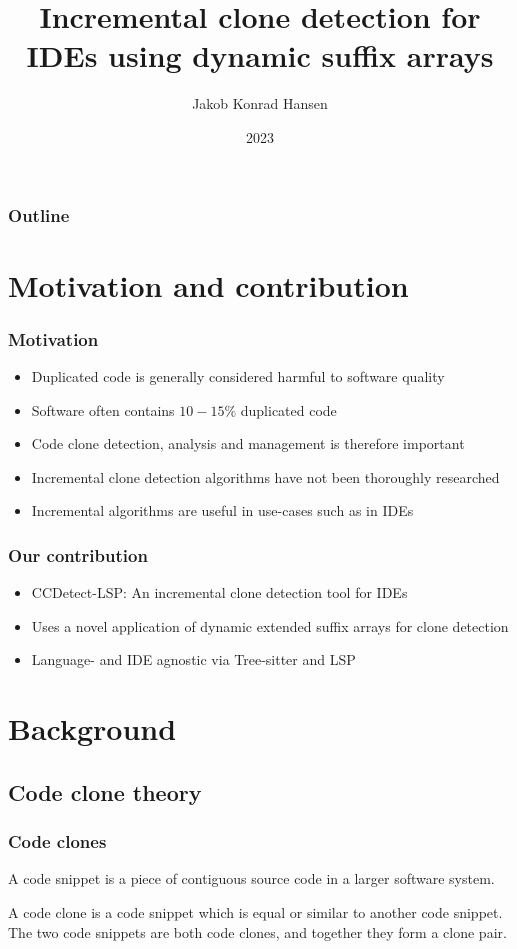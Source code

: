 \documentclass[aspectratio=1610, xcolor=table]{beamer}
\title{Incremental clone detection for IDEs using dynamic suffix arrays}
\author{Jakob Konrad Hansen}
\institute{University of Oslo}
\date{2023}
\begin{document}
\frame{\titlepage}

\begin{frame}
    \frametitle{Outline}
    \tableofcontents
\end{frame}

\section{Motivation and contribution}

\begin{frame}
\frametitle{Motivation}
\begin{itemize}
    \item Duplicated code is generally considered harmful to software quality
    \item Software often contains $10-15\%$ duplicated code
    \item Code clone detection, analysis and management is therefore important
    \item Incremental clone detection algorithms have not been thoroughly researched
    \item Incremental algorithms are useful in use-cases such as in IDEs
\end{itemize}
\end{frame}

\begin{frame}
\frametitle{Our contribution}
\begin{itemize}
    \item CCDetect-LSP: An incremental clone detection tool for IDEs
    \item Uses a novel application of dynamic extended suffix arrays for clone detection
    \item Language- and IDE agnostic via Tree-sitter and LSP
\end{itemize}
\end{frame}

\section{Background}

\subsection{Code clone theory}

\begin{frame}
    \frametitle{Code clones}

    \begin{definition}
        A code snippet is a piece of contiguous source code in a larger software system.
    \end{definition}

    \begin{definition}
        A code clone is a code snippet which is equal or similar to another code snippet. The two
        code snippets are both code clones, and together they form a clone pair. 
    \end{definition}
\end{frame}
\end{document}
